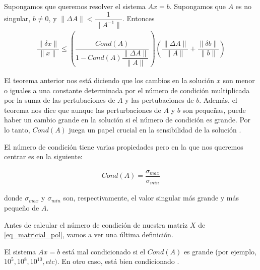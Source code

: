 \begin{theorem} \label{teo:perturbaciones}
Supongamos que queremos resolver el sistema $Ax = b$. Supongamos que $A$ es no singular, $b \neq 0$, y $\parallel \Delta A \parallel < \dfrac{1}{\parallel A^{-1} \parallel}$. Entonces
\begin{equation*}
    \begin{aligned}
    \dfrac{\parallel \delta x \parallel}{\parallel x \parallel} \leq (\dfrac{Cond(A)}{1 - Cond(A) \dfrac{\parallel \Delta A \parallel}{\parallel A \parallel}}) (\dfrac{\parallel \Delta A \parallel}{\parallel A \parallel} + \dfrac{\parallel \delta b \parallel}{\parallel b \parallel})
    \end{aligned}
\end{equation*} \cite[p.~65]{numerical_linear_algebra}
\end{theorem}

El teorema anterior nos está diciendo que los cambios en la solución $x$ son menor o iguales a una constante determinada por el número de condición multiplicada por la suma de las pertubaciones de $A$ y las pertubaciones de $b$. Además, el teorema nos dice que aunque las perturbaciones de $A$ y $b$ son pequeñas, puede haber un cambio grande en la solución si el número de condición es grande. Por lo tanto, $Cond(A)$ juega un papel crucial en la sensibilidad de la solución \cite{numerical_linear_algebra}. 


El número de condición tiene varias propiedades pero en la que nos queremos centrar es en la siguiente: 

\begin{equation} \label{formula:num_cond}
    \begin{aligned}
    Cond(A) = \dfrac{\sigma_{max}}{\sigma_{min}}
    \end{aligned}
\end{equation}

donde $\sigma_{max}$ y $\sigma_{min}$ son, respectivamente, el valor singular más grande y más pequeño de $A$. 

Antes de calcular el número de condición de nuestra matriz $X$ de \ref{eq_matricial_pol}, vamos a ver una última definición. 

\begin{definition} \label{def:condicionamiento}
El sistema $Ax = b$ está mal condicionado si el $Cond(A)$ es grande (por ejemplo, $10^{5}, 10^{8}, 10^{10}, etc)$. En otro caso, está bien condicionado \cite[p.~68]{numerical_linear_algebra}.
\end{definition}

